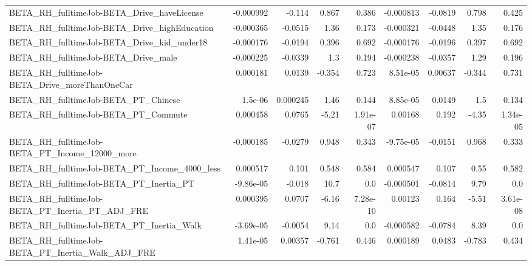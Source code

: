 \begin{tabular}{lrrrrrrrr}
BETA\_RH\_fulltimeJob-BETA\_Drive\_haveLicense         &   -0.000992 &       -0.114 &    0.867 &    0.386 &  -0.000813 &     -0.0819 &        0.798 &         0.425 \\
BETA\_RH\_fulltimeJob-BETA\_Drive\_highEducation       &   -0.000365 &      -0.0515 &     1.36 &    0.173 &  -0.000321 &     -0.0448 &         1.35 &         0.176 \\
BETA\_RH\_fulltimeJob-BETA\_Drive\_kid\_under18         &   -0.000176 &      -0.0194 &    0.396 &    0.692 &  -0.000176 &     -0.0196 &        0.397 &         0.692 \\
BETA\_RH\_fulltimeJob-BETA\_Drive\_male                &   -0.000225 &      -0.0339 &      1.3 &    0.194 &  -0.000238 &     -0.0357 &         1.29 &         0.196 \\
BETA\_RH\_fulltimeJob-BETA\_Drive\_moreThanOneCar      &    0.000181 &       0.0139 &   -0.354 &    0.723 &   8.51e-05 &     0.00637 &       -0.344 &         0.731 \\
BETA\_RH\_fulltimeJob-BETA\_PT\_Chinese                &     1.5e-06 &     0.000245 &     1.46 &    0.144 &   8.85e-05 &      0.0149 &          1.5 &         0.134 \\
BETA\_RH\_fulltimeJob-BETA\_PT\_Commute                &    0.000458 &       0.0765 &    -5.21 & 1.91e-07 &    0.00168 &       0.192 &        -4.35 &      1.34e-05 \\
BETA\_RH\_fulltimeJob-BETA\_PT\_Income\_12000\_more      &   -0.000185 &      -0.0279 &    0.948 &    0.343 &  -9.75e-05 &     -0.0151 &        0.968 &         0.333 \\
BETA\_RH\_fulltimeJob-BETA\_PT\_Income\_4000\_less       &    0.000517 &        0.101 &    0.548 &    0.584 &   0.000547 &       0.107 &         0.55 &         0.582 \\
BETA\_RH\_fulltimeJob-BETA\_PT\_Inertia\_PT             &   -9.86e-05 &       -0.018 &     10.7 &      0.0 &  -0.000501 &     -0.0814 &         9.79 &           0.0 \\
BETA\_RH\_fulltimeJob-BETA\_PT\_Inertia\_PT\_ADJ\_FRE     &    0.000395 &       0.0707 &    -6.16 & 7.28e-10 &    0.00123 &       0.164 &        -5.51 &      3.61e-08 \\
BETA\_RH\_fulltimeJob-BETA\_PT\_Inertia\_Walk           &   -3.69e-05 &      -0.0054 &     9.14 &      0.0 &  -0.000582 &     -0.0784 &         8.39 &           0.0 \\
BETA\_RH\_fulltimeJob-BETA\_PT\_Inertia\_Walk\_ADJ\_FRE   &    1.41e-05 &      0.00357 &   -0.761 &    0.446 &   0.000189 &      0.0483 &       -0.783 &         0.434 \\

\end{tabular}
